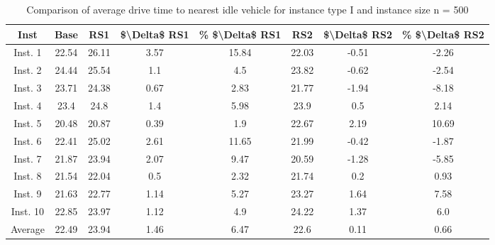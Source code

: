 \begin{table}[H]
\centering
\begin{tabular}{cccccccc}
  \hline
  \textbf{Inst} & \textbf{Base} & \textbf{RS1} & \textbf{\$\textbackslash{}Delta\$  RS1} & \textbf{\% \$\textbackslash{}Delta\$  RS1} & \textbf{RS2} & \textbf{\$\textbackslash{}Delta\$  RS2} & \textbf{\% \$\textbackslash{}Delta\$  RS2} \\\hline
  Inst. 1 & 22.54 & 26.11 & 3.57 & 15.84 & 22.03 & -0.51 & -2.26 \\
  Inst. 2 & 24.44 & 25.54 & 1.1 & 4.5 & 23.82 & -0.62 & -2.54 \\
  Inst. 3 & 23.71 & 24.38 & 0.67 & 2.83 & 21.77 & -1.94 & -8.18 \\
  Inst. 4 & 23.4 & 24.8 & 1.4 & 5.98 & 23.9 & 0.5 & 2.14 \\
  Inst. 5 & 20.48 & 20.87 & 0.39 & 1.9 & 22.67 & 2.19 & 10.69 \\
  Inst. 6 & 22.41 & 25.02 & 2.61 & 11.65 & 21.99 & -0.42 & -1.87 \\
  Inst. 7 & 21.87 & 23.94 & 2.07 & 9.47 & 20.59 & -1.28 & -5.85 \\
  Inst. 8 & 21.54 & 22.04 & 0.5 & 2.32 & 21.74 & 0.2 & 0.93 \\
  Inst. 9 & 21.63 & 22.77 & 1.14 & 5.27 & 23.27 & 1.64 & 7.58 \\
  Inst. 10 & 22.85 & 23.97 & 1.12 & 4.9 & 24.22 & 1.37 & 6.0 \\
  Average & 22.49 & 23.94 & 1.46 & 6.47 & 22.6 & 0.11 & 0.66 \\\hline
\end{tabular}
\caption{Comparison of average drive time to nearest idle vehicle for instance type I and instance size n = 500}
\label{tab:wait:resrelocation-nearest-drive-time-comparison_I_500}
\end{table}
